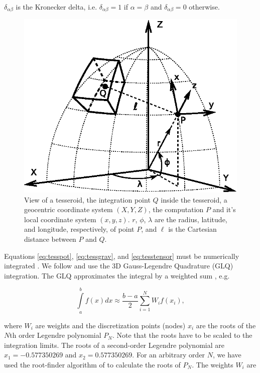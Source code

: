 \noindent
$\delta_{\alpha\beta}$ is the Kronecker delta,
i.e. $\delta_{\alpha\beta}=1$ if $\alpha=\beta$
and $\delta_{\alpha\beta}=0$ otherwise.

\begin{figure}
    \centering
    \includegraphics{figs/tesseroid}
    \caption{
        View of a tesseroid,
        the integration point $Q$ inside the tesseroid,
        a geocentric coordinate system $(X, Y, Z)$,
        the computation $P$ and it's local coordinate system $(x, y, z)$.
        $r$, $\phi$, $\lambda$ are
        the radius, latitude, and longitude, respectively, of point $P$,
        and $\ell$ is the Cartesian distance between $P$ and $Q$.
    }
    \label{fig:tesseroid}
\end{figure}

Equations
\ref{eq:tesspot},
\ref{eq:tessgrav},
and
\ref{eq:tesstensor}
must be numerically integrated
\citep{Grombein2013}.
We follow \citet{Asgharzadeh2007}
and use the 3D Gauss-Legendre Quadrature (GLQ) integration.
The GLQ
approximates the integral by
a weighted sum
\citep{Hildebrand1987},
e.g.

\begin{equation}
    \int\limits_a^b f(x) dx \approx
    \frac{b-a}{2}\sum\limits_{i=1}^N W_i f(x_i),
\end{equation}

\noindent
where
$W_i$ are weights and
the discretization points (nodes) $x_i$
are the roots of the $N$th order Legendre polynomial $P_N$.
Note that the roots have to be scaled to the integration limits.
The roots of a second-order Legendre polynomial are
$x_1=-0.577350269$ and $x_2=0.577350269$.
For an arbitrary order $N$,
we have used the root-finder algorithm
of \citet{Barrera-Figueroa2006}
to calculate the roots of $P_N$.
The weights $W_i$ are \citep{Hildebrand1987}

